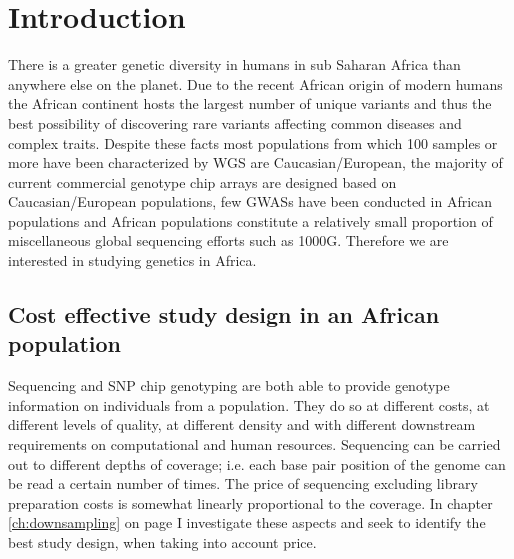 
\chapter{Introduction}

There is a greater genetic diversity in humans in sub Saharan Africa than anywhere else on the planet.\cite{Bowcock1994}\cite{Jorde1995}\cite{Tishkoff08031996}\cite{Jorde2000}\cite{Stephens2001}\cite{Tishkoff2002}\cite{Stringer2003}\cite{Tishkoff2004}\cite{HapMap2005}\cite{Ramachandran01112005}\cite{Tishkoff22052009}\cite{1000G2010}\cite{1000G2012}\cite{Gurdasani2015}
Due to the recent African origin of modern humans the African continent hosts the largest number of unique variants and thus the best possibility of discovering rare variants affecting common diseases and complex traits.
Despite these facts most populations from which 100 samples or more have been characterized by \gls{WGS} are Caucasian/European, the majority of current commercial genotype chip arrays are designed based on Caucasian/European populations, few \glspl{GWAS} have been conducted in African populations and African populations constitute a relatively small proportion of miscellaneous global sequencing efforts such as 1000G.\cite{1000G2012}
Therefore we are interested in studying genetics in Africa.

\section{Cost effective study design in an African population}
Sequencing and \gls{SNP} chip genotyping are both able to provide genotype information on individuals from a population. They do so at different costs, at different levels of quality, at different density and with different downstream requirements on computational and human resources. Sequencing can be carried out to different depths of coverage; i.e. each base pair position of the genome can be read a certain number of times. The price of sequencing excluding library preparation costs is somewhat linearly proportional to the coverage. In chapter \ref{ch:downsampling} on page \pageref{ch:downsampling} I investigate these aspects and seek to identify the best study design, when taking into account price.

